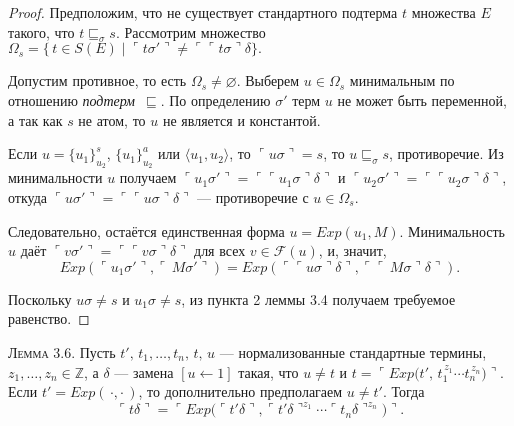 \begin{proof}
Предположим, что не существует стандартного подтерма $t$ множества $E$
такого, что $t\sqsubseteq_{\sigma}s$.  
Рассмотрим множество
\(
  \Omega_{s}=\bigl\{\,t\in S(E)\mid \ulcorner t\sigma'\urcorner\neq \ulcorner\ulcorner t\sigma\urcorner\delta\bigr\}.
\)

\noindent
Допустим противное, то есть $\Omega_{s}\neq\varnothing$.
Выберем $u\in\Omega_{s}$ минимальным по отношению
\emph{подтерм}~$\sqsubseteq$.
По определению $\sigma'$ терм $u$ не может быть переменной,
а так как $s$ не атом, то $u$ не является и константой.

\medskip\noindent
Если $u=\{u_{1}\}_{u_{2}}^{s}$, $\{u_{1}\}_{u_{2}}^{a}$
или $\langle u_{1},u_{2}\rangle$, то $\ulcorner u\sigma\urcorner=s$, то $u\sqsubseteq_{\sigma}s$, противоречие.
Из минимальности $u$ получаем
$\ulcorner u_{1}\sigma'\urcorner=\ulcorner\ulcorner u_{1}\sigma\urcorner\delta\urcorner$ и $\ulcorner u_{2}\sigma'\urcorner=\ulcorner\ulcorner u_{2}\sigma\urcorner\delta\urcorner$,
откуда $\ulcorner u\sigma'\urcorner=\ulcorner\ulcorner u\sigma\urcorner\delta\urcorner$ — противоречие с $u\in\Omega_{s}$.

\medskip\noindent
Следовательно, остаётся единственная форма  
\(
  u=Exp(u_{1},M).
\)
Минимальность $u$ даёт
$\ulcorner v\sigma'\urcorner=\ulcorner\ulcorner v\sigma\urcorner\delta\urcorner$ для всех $v\in\mathcal F(u)$, и, значит,
\[
  Exp(\ulcorner u_{1}\sigma'\urcorner,\ulcorner\,M\sigma'\urcorner)
    =Exp(\ulcorner\ulcorner u\sigma\urcorner\delta\urcorner,\ulcorner\ulcorner\,M\sigma\urcorner\delta\urcorner).
\]

Поскольку $u\sigma\neq s$ и $u_{1}\sigma\neq s$,  
из пункта 2 леммы 3.4 получаем требуемое равенство.
\end{proof}

\textsc{Лемма 3.6.} 
Пусть $t',\,t_1,\dots,t_n,\,t,\,u$ — нормализованные стандартные термины,
$z_1,\dots,z_n\in\mathbb Z$, а $\delta$ — замена $[u\leftarrow1]$ такая, что
$u\neq t$ и $t=\ulcorner Exp\bigl(t',\,t_1^{\,z_1}\!\cdots t_n^{\,z_n}\bigr)\urcorner$.
Если $t'=Exp(\,\cdot,\cdot\,)$, то дополнительно предполагаем
$u\neq t'$. Тогда
\[
  \ulcorner t\delta\urcorner
  =\ulcorner Exp\bigl(\ulcorner t'\delta\urcorner,
        \ulcorner t'\delta\urcorner^{z_1}\!\cdots \ulcorner t_n\delta\urcorner^{z_n}\bigr)\urcorner.
\]

